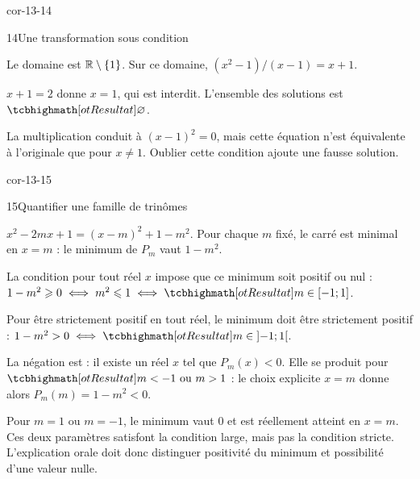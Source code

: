 \begin{blocLivre}{cor-13-14}
\begin{corrige}{14}{Une transformation sous condition}
\begin{questions}
\item Le domaine est $\mathbb{R}\setminus\{1\}$. Sur ce domaine, $(x^2-1)/(x-1)=x+1$.
\item $x+1=2$ donne $x=1$, qui est interdit. L’ensemble des solutions est $\res{\varnothing}$.
\item La multiplication conduit à $(x-1)^2=0$, mais cette équation n’est équivalente à l’originale que pour $x\neq1$. Oublier cette condition ajoute une fausse solution.
\end{questions}
\end{corrige}
\end{blocLivre}
\begin{blocLivre}{cor-13-15}
\begin{corrige}{15}{Quantifier une famille de trinômes}
\begin{questions}
\item $x^2-2mx+1=(x-m)^2+1-m^2$.
Pour chaque $m$ fixé, le carré est minimal en $x=m$ : le minimum de $P_m$ vaut $1-m^2$.
\item La condition pour tout réel $x$ impose que ce minimum soit positif ou nul :
$1-m^2\geq0\iff m^2\leq1\iff\res{m\in[-1;1]}$.
\item Pour être strictement positif en tout réel, le minimum doit être strictement positif :
$1-m^2>0\iff\res{m\in\mathopen{]}-1;1[}$.
\item La négation est : il existe un réel $x$ tel que $P_m(x)<0$.
Elle se produit pour $\res{m<-1\text{ ou }m>1}$ : le choix explicite $x=m$ donne alors $P_m(m)=1-m^2<0$.
\item Pour $m=1$ ou $m=-1$, le minimum vaut 0 et est réellement atteint en $x=m$.
Ces deux paramètres satisfont la condition large, mais pas la condition stricte.
L’explication orale doit donc distinguer positivité du minimum et possibilité d’une valeur nulle.
\end{questions}

\end{corrige}
\end{blocLivre}
